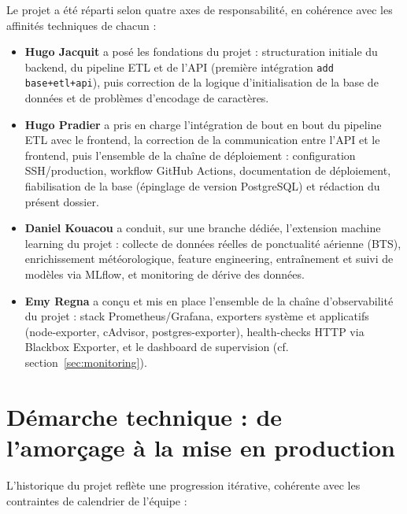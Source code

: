 \documentclass[11pt,a4paper]{report}
\newcommand{\code}[1]{\lstinline{#1}}
\begin{document}
Le projet a été réparti selon quatre axes de responsabilité, en cohérence avec les affinités techniques de chacun :

\begin{itemize}
  \item \textbf{Hugo Jacquit} a posé les fondations du projet : structuration initiale du backend, du pipeline ETL et de l'API (première intégration \code{add base+etl+api}), puis correction de la logique d'initialisation de la base de données et de problèmes d'encodage de caractères.
  \item \textbf{Hugo Pradier} a pris en charge l'intégration de bout en bout du pipeline ETL avec le frontend, la correction de la communication entre l'API et le frontend, puis l'ensemble de la chaîne de déploiement : configuration SSH/production, workflow GitHub Actions, documentation de déploiement, fiabilisation de la base (épinglage de version PostgreSQL) et rédaction du présent dossier.
  \item \textbf{Daniel Kouacou} a conduit, sur une branche dédiée, l'extension machine learning du projet : collecte de données réelles de ponctualité aérienne (BTS), enrichissement météorologique, feature engineering, entraînement et suivi de modèles via MLflow, et monitoring de dérive des données.
  \item \textbf{Emy Regna} a conçu et mis en place l'ensemble de la chaîne d'observabilité du projet : stack Prometheus/Grafana, exporters système et applicatifs (node-exporter, cAdvisor, postgres-exporter), health-checks HTTP via Blackbox Exporter, et le dashboard de supervision (cf. section~\ref{sec:monitoring}).
\end{itemize}

\section{Démarche technique : de l'amorçage à la mise en production}

L'historique du projet reflète une progression itérative, cohérente avec les contraintes de calendrier de l'équipe :
\end{document}
